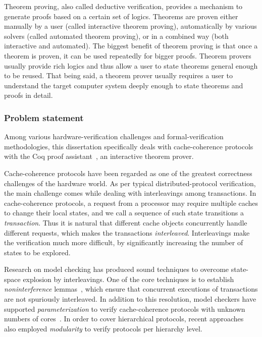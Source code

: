 Theorem proving, also called deductive verification, provides a mechanism to generate proofs based on a certain set of logics.
Theorems are proven either manually by a user (called interactive theorem proving), automatically by various solvers (called automated theorem proving), or in a combined way (both interactive and automated).
The biggest benefit of theorem proving is that once a theorem is proven, it can be used repeatedly for bigger proofs.
Theorem provers usually provide rich logics and thus allow a user to state theorems general enough to be reused.
That being said, a theorem prover usually requires a user to understand the target computer system deeply enough to state theorems and proofs in detail.

\subsubsection{Problem statement}

Among various hardware-verification challenges and formal-verification methodologies, this dissertation specifically deals with cache-coherence protocols with the Coq proof assistant~\cite{Coq}, an interactive theorem prover.

Cache-coherence protocols have been regarded as one of the greatest correctness challenges of the hardware world.
As per typical distributed-protocol verification, the main challenge comes while dealing with interleavings among transactions.
In cache-coherence protocols, a request from a processor may require multiple caches to change their local states, and we call a sequence of such state transitions a \emph{transaction}.
Thus it is natural that different cache objects concurrently handle different requests, which makes the transactions \emph{interleaved}.
Interleavings make the verification much more difficult, by significantly increasing the number of states to be explored.

Research on model checking has produced sound techniques to overcome state-space explosion by interleavings.
One of the core techniques is to establish \emph{noninterference} lemmas~\cite{McMillan:1999,McMillan:2001,Chou:2004,flow:Talupur:2008,flow:OLeary:2009,flow:Sethi:2014}, which ensure that concurrent executions of transactions are not spuriously interleaved.
In addition to this resolution, model checkers have supported \emph{parameterization} to verify cache-coherence protocols with unknown numbers of cores~\cite{Zhang:2010,Zhang:2014,Banks:2017}.
In order to cover hierarchical protocols, recent approaches~\cite{Chen:2008,Chen:2010,Opeoluwa:2016,Opeoluwa:2017,Oswald:2020} also employed \emph{modularity} to verify protocols per hierarchy level.

